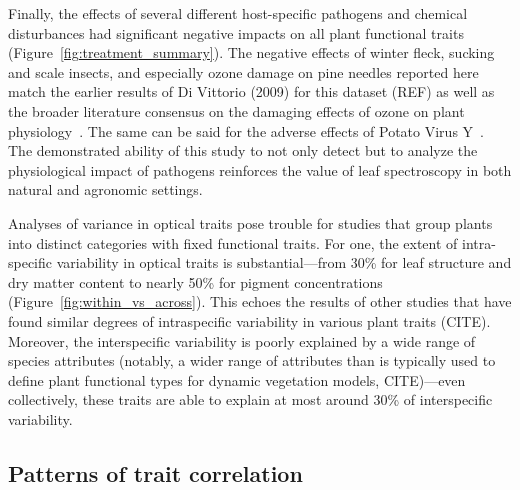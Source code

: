 Finally, the effects of several different host-specific pathogens and chemical disturbances had significant negative impacts on all plant functional traits (Figure~\ref{fig:treatment_summary}).
The negative effects of winter fleck, sucking and scale insects, and especially ozone damage on pine needles reported here match the earlier results of Di Vittorio (2009) for this dataset (REF) as well as the broader literature consensus on the damaging effects of ozone on plant physiology~\cite{lindroth_2010_impacts}.
The same can be said for the adverse effects of Potato Virus Y~\cite{scholthof_2011_top10}.
The demonstrated ability of this study to not only detect but to analyze the physiological impact of pathogens reinforces the value of leaf spectroscopy in both natural and agronomic settings.


Analyses of variance in optical traits pose trouble for studies that group plants into distinct categories with fixed functional traits.
For one, the extent of intra-specific variability in optical traits is substantial---from 30\% for leaf structure and dry matter content to nearly 50\% for pigment concentrations (Figure~\ref{fig:within_vs_across}).
This echoes the results of other studies that have found similar degrees of intraspecific variability in various plant traits (CITE).
Moreover, the interspecific variability is poorly explained by a wide range of species attributes (notably, a wider range of attributes than is typically used to define plant functional types for dynamic vegetation models, CITE)---even collectively, these traits are able to explain at most around 30\% of interspecific variability.

\subsection{Patterns of trait correlation}

